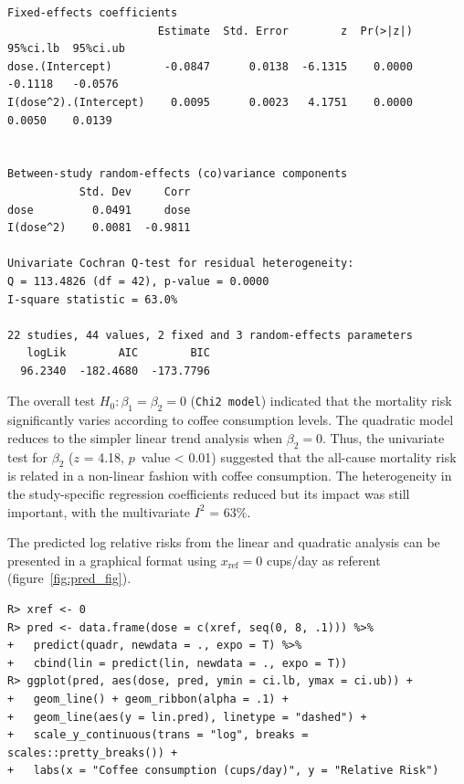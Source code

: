 \documentclass[11pt,a4paper,twoside,openany]{book}\usepackage{knitr}
\begin{document}
{\begin{knitrout}
\begin{kframe}
\begin{verbatim}
Fixed-effects coefficients
                       Estimate  Std. Error        z  Pr(>|z|)  95%ci.lb  95%ci.ub
dose.(Intercept)        -0.0847      0.0138  -6.1315    0.0000   -0.1118   -0.0576
I(dose^2).(Intercept)    0.0095      0.0023   4.1751    0.0000    0.0050    0.0139


Between-study random-effects (co)variance components
           Std. Dev     Corr
dose         0.0491     dose
I(dose^2)    0.0081  -0.9811

Univariate Cochran Q-test for residual heterogeneity:
Q = 113.4826 (df = 42), p-value = 0.0000
I-square statistic = 63.0%

22 studies, 44 values, 2 fixed and 3 random-effects parameters
   logLik        AIC        BIC  
  96.2340  -182.4680  -173.7796  
\end{verbatim}
\end{kframe}
\end{knitrout}

\noindent The overall test $H_0: \beta_1 = \beta_2 = 0$ (\texttt{Chi2 model}) indicated that the mortality risk significantly varies according to coffee consumption levels. The quadratic model reduces to the simpler linear trend analysis when $\beta_2 = 0$. Thus, the univariate test for $\beta_2$ ($z$ = 4.18, $p$~value < 0.01) suggested that the all-cause mortality risk is related in a non-linear fashion with coffee consumption. The heterogeneity in the study-specific regression coefficients reduced but its impact was still important, with the multivariate $I^2$ = 63\%. 

The predicted log relative risks from the linear and quadratic analysis can be presented in a graphical format using $x_\mathrm{ref} = 0$ cups/day as referent (figure~\ref{fig:pred_fig}).

\begin{knitrout}\footnotesize
{}\color{fgcolor}\begin{kframe}
\begin{verbatim}
R> xref <- 0
R> pred <- data.frame(dose = c(xref, seq(0, 8, .1))) %>%
+   predict(quadr, newdata = ., expo = T) %>%
+   cbind(lin = predict(lin, newdata = ., expo = T))
R> ggplot(pred, aes(dose, pred, ymin = ci.lb, ymax = ci.ub)) +
+   geom_line() + geom_ribbon(alpha = .1) +
+   geom_line(aes(y = lin.pred), linetype = "dashed") +
+   scale_y_continuous(trans = "log", breaks = scales::pretty_breaks()) +
+   labs(x = "Coffee consumption (cups/day)", y = "Relative Risk")
\end{verbatim}
\end{kframe}\begin{figure}[ht!]


\end{figure}
\end{knitrout}}
\end{document}
